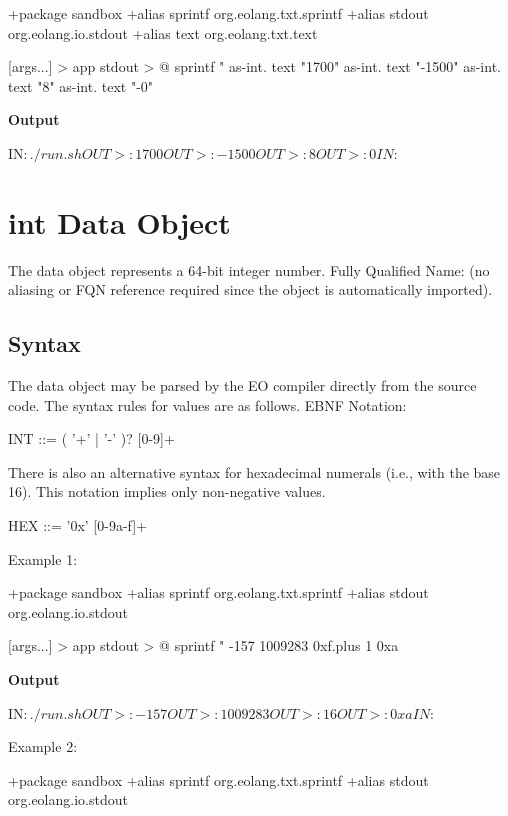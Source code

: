\documentclass[12pt]{book}
\begin{document}
{\begin{ffcode}
+package sandbox
+alias sprintf org.eolang.txt.sprintf
+alias stdout org.eolang.io.stdout
+alias text org.eolang.txt.text

[args...] > app
  stdout > @
    sprintf
      "%
    as-int.
      text "1700"
    as-int.
      text "-1500"
    as-int.
      text "8"
    as-int.
      text "-0"
\end{ffcode}
\textbf{Output}
\begin{ffcode}
IN$: ./run.sh
OUT>: 1700
OUT>: -1500
OUT>: 8
OUT>: 0
IN$:
\end{ffcode}

\section{int Data Object}
The  data object represents a 64-bit integer number.
Fully Qualified Name:  (no aliasing or FQN reference required since the object is automatically imported).

\subsection{Syntax}
The  data object may be parsed by the EO compiler directly from the source code. The syntax rules for values are as follows. EBNF Notation:

\begin{ffcode}
INT      ::= ( '+' | '-' )? [0-9]+
\end{ffcode}
There is also an alternative syntax for hexadecimal numerals (i.e., with the base 16). This notation implies only non-negative values.

\begin{ffcode}
HEX      ::= '0x' [0-9a-f]+
\end{ffcode}
Example 1:
\begin{ffcode}
+package sandbox
+alias sprintf org.eolang.txt.sprintf
+alias stdout org.eolang.io.stdout

[args...] > app
  stdout > @
    sprintf
      "%
      -157
      1009283
      0xf.plus 1
      0xa
\end{ffcode}
\textbf{Output}
\begin{ffcode}
IN$: ./run.sh
OUT>: -157
OUT>: 1009283
OUT>: 16
OUT>: 0xa
IN$:
\end{ffcode}
Example 2:
\begin{ffcode}
+package sandbox
+alias sprintf org.eolang.txt.sprintf
+alias stdout org.eolang.io.stdout


\end{ffcode}}
\end{document}
